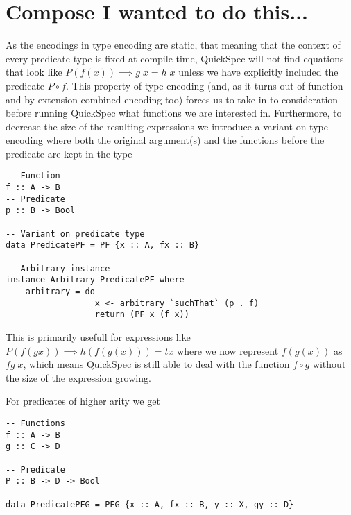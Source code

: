 \section{Compose I wanted to do this...}
As the encodings in type encoding are static, that meaning
that the context of every predicate type is fixed
at compile time, QuickSpec will not find equations
that look like $P(f(x))\implies g\;x=h\;x$
unless we have explicitly included the 
predicate $P \circ f$. This property of type encoding
(and, as it turns out of function and by extension combined encoding too)
forces us to take in to consideration before running QuickSpec
what functions we are interested in. 
Furthermore, to decrease the size of the resulting expressions we introduce
a variant on type encoding where both the original argument(s) and the
functions before the predicate are kept in the type
\begin{verbatim}
-- Function
f :: A -> B
-- Predicate
p :: B -> Bool

-- Variant on predicate type
data PredicatePF = PF {x :: A, fx :: B}

-- Arbitrary instance
instance Arbitrary PredicatePF where
    arbitrary = do
                  x <- arbitrary `suchThat` (p . f)
                  return (PF x (f x))

\end{verbatim}
This is primarily usefull for expressions like $P (f (g x))\implies h(f(g(x))) = t x$
where we now represent $f(g(x))$ as $fg\;x$, which means QuickSpec is still able to
deal with the function $f\circ g$ without the size of the expression growing.

For predicates of higher arity we get
\begin{verbatim}
-- Functions
f :: A -> B
g :: C -> D

-- Predicate
P :: B -> D -> Bool

data PredicatePFG = PFG {x :: A, fx :: B, y :: X, gy :: D}
\end{verbatim}

